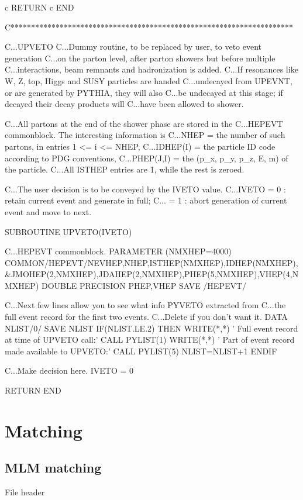 c      RETURN
c      END

C*********************************************************************

C...UPVETO
C...Dummy routine, to be replaced by user, to veto event generation
C...on the parton level, after parton showers but before multiple
C...interactions, beam remnants and hadronization is added.
C...If resonances like W, Z, top, Higgs and SUSY particles are handed
C...undecayed from UPEVNT, or are generated by PYTHIA, they will also
C...be undecayed at this stage; if decayed their decay products will
C...have been allowed to shower.

C...All partons at the end of the shower phase are stored in the
C...HEPEVT commonblock. The interesting information is
C...NHEP = the number of such partons, in entries 1 <= i <= NHEP,
C...IDHEP(I) = the particle ID code according to PDG conventions,
C...PHEP(J,I) = the (p_x, p_y, p_z, E, m) of the particle.
C...All ISTHEP entries are 1, while the rest is zeroed.

C...The user decision is to be conveyed by the IVETO value.
C...IVETO = 0 : retain current event and generate in full;
C...      = 1 : abort generation of current event and move to next.

      SUBROUTINE UPVETO(IVETO)

C...HEPEVT commonblock.
      PARAMETER (NMXHEP=4000)
      COMMON/HEPEVT/NEVHEP,NHEP,ISTHEP(NMXHEP),IDHEP(NMXHEP),
     &JMOHEP(2,NMXHEP),JDAHEP(2,NMXHEP),PHEP(5,NMXHEP),VHEP(4,NMXHEP)
      DOUBLE PRECISION PHEP,VHEP
      SAVE /HEPEVT/

C...Next few lines allow you to see what info PYVETO extracted from
C...the full event record for the first two events.
C...Delete if you don't want it.
      DATA NLIST/0/
      SAVE NLIST
      IF(NLIST.LE.2) THEN
        WRITE(*,*) ' Full event record at time of UPVETO call:'
        CALL PYLIST(1)
        WRITE(*,*) ' Part of event record made available to UPVETO:'
        CALL PYLIST(5)
        NLIST=NLIST+1
      ENDIF

C...Make decision here.
      IVETO = 0

      RETURN
      END

\eatline
\nwendcode{}\nwdocspar
\section{Matching}
\subsection{MLM matching}
\nwenddocs{}\endmoddef
\LA{}File header\RA{}

